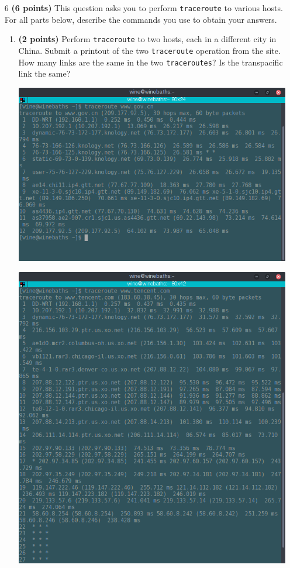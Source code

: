 \documentclass{article}
\begin{document}
\begin{enumerate}
\item[6]\textbf{(6 points)} This question asks you to perform \texttt{traceroute} to various hosts. For all parts below, describe the commands you use to obtain your answers.

\begin{enumerate}
\item \textbf{(2 points)} Perform \texttt{traceroute} to two hosts, each in a different city in China. Submit a printout of the two \texttt{traceroute} operation from the site. How many links are the same in the two \texttt{traceroutes}? Is the transpacific link the same?

\includegraphics[scale=0.5]{cn1.png}

\includegraphics[scale=0.5]{cn2.png}


\end{enumerate}
\end{enumerate}
\end{document}
